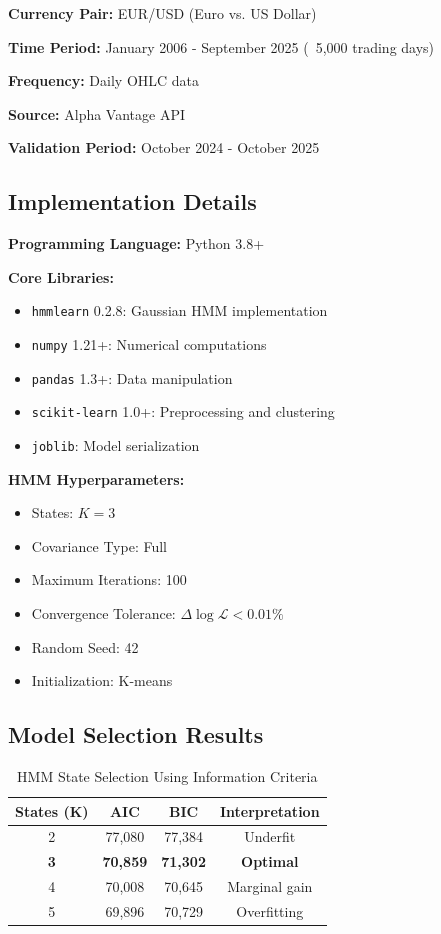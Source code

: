 \documentclass[conference]{IEEEtran}
\begin{document}
\textbf{Currency Pair:} EUR/USD (Euro vs. US Dollar)

\textbf{Time Period:} January 2006 - September 2025 (~5,000 trading days)

\textbf{Frequency:} Daily OHLC data

\textbf{Source:} Alpha Vantage API

\textbf{Validation Period:} October 2024 - October 2025

\subsection{Implementation Details}

\textbf{Programming Language:} Python 3.8+

\textbf{Core Libraries:}
\begin{itemize}
\item \texttt{hmmlearn} 0.2.8: Gaussian HMM implementation
\item \texttt{numpy} 1.21+: Numerical computations
\item \texttt{pandas} 1.3+: Data manipulation
\item \texttt{scikit-learn} 1.0+: Preprocessing and clustering
\item \texttt{joblib}: Model serialization
\end{itemize}

\textbf{HMM Hyperparameters:}
\begin{itemize}
\item States: $K = 3$
\item Covariance Type: Full
\item Maximum Iterations: 100
\item Convergence Tolerance: $\Delta\log\mathcal{L} < 0.01\%$
\item Random Seed: 42
\item Initialization: K-means
\end{itemize}

\subsection{Model Selection Results}

\begin{table}[htbp]
\centering
\caption{HMM State Selection Using Information Criteria}
\label{tab:model_selection}
\begin{tabular}{cccc}
\toprule
\textbf{States (K)} & \textbf{AIC} & \textbf{BIC} & \textbf{Interpretation} \\
\midrule
2 & 77,080 & 77,384 & Underfit \\
\textbf{3} & \textbf{70,859} & \textbf{71,302} & \textbf{Optimal} \\
4 & 70,008 & 70,645 & Marginal gain \\
5 & 69,896 & 70,729 & Overfitting \\
\bottomrule
\end{tabular}
\end{table}
\end{document}
